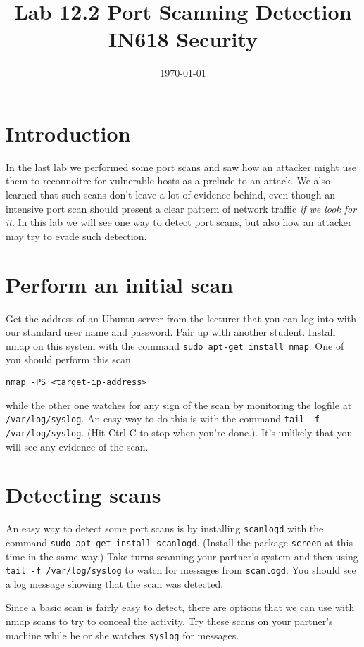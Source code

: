 \documentclass{article}
\begin{document}
\title{ Lab 12.2 Port Scanning Detection\\ IN618 Security}
\date{\today}
\maketitle

\section*{Introduction}
In the last lab we performed some port scans and saw how an attacker might use them to reconnoitre for vulnerable hosts as a prelude to an attack. We also learned that such scans don't leave a lot of evidence behind, even though an intensive port scan should present a clear pattern of network traffic \emph{if we look for it}. In this lab we will see one way to detect port scans, but also how an attacker may try to evade such detection.

\section{Perform an initial scan}
Get the address of an Ubuntu server from the lecturer that you can log into with our standard user name and password. Pair up with another student.  Install nmap on this system with the command \texttt{sudo apt-get install nmap}.  One of you should perform this scan

\texttt{nmap -PS <target-ip-address> }

while the other one watches for any sign of the scan by monitoring the logfile at \texttt{/var/log/syslog}.  An easy way to do this is with the command \texttt{tail -f /var/log/syslog}. (Hit Ctrl-C to stop when you're done.). It's unlikely that you will see any evidence of the scan.

\section{Detecting scans}
An easy way to detect some port scans is by installing \texttt{scanlogd} with the command \texttt{sudo apt-get install scanlogd}. (Install the package \texttt{screen} at this time in the same way.) Take turns scanning your partner's system and then using \texttt{tail -f /var/log/syslog} to watch for messages from \texttt{scanlogd}. You should see a log message showing that the scan was detected.

Since a basic scan is fairly easy to detect, there are options that we can use with nmap scans to try to conceal the activity. Try these scans on your partner's machine while he or she watches \texttt{syslog} for messages.
\end{document}
